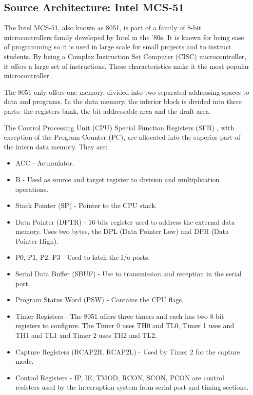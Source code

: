 \documentclass{report}
\begin{document}
		\subsection{Source Architecture: Intel MCS-51}
		
		\par The Intel MCS-51, also known as 8051, is part of a family of 8-bit microcontrollers family developed by Intel in the '80s. It is known for being ease of programming so it is used in large scale for small projects and to instruct students. By being a Complex Instruction Set Computer (CISC) microcontroller, it offers a large set of instructions. These characteristics make it the most popular microcontroller.
		\par The 8051 only offers one memory, divided into two separated addressing spaces to data and programs. In the data memory, the inferior block is divided into three parts: the registers bank, the bit addressable area and the draft area.
		\par The Control Processing Unit (CPU) Special Function Registers (SFR) , with exception of the Program Counter (PC), are allocated into the superior part of the intern data memory.  They are:
		\begin{itemize}
			\item ACC - Acumulator.
			\item B - Used as source and target register to division and multiplication operations.
			\item Stack Pointer (SP) - Pointer to the CPU stack.
			\item Data Pointer (DPTR) - 16-bits register used to address the external data memory. Uses two bytes, the DPL (Data Pointer Low) and DPH (Data Pointer High).
			\item P0, P1, P2, P3 - Used to latch the I/o ports.
			\item Serial Data Buffer (SBUF) - Use to transmission and reception in the serial port.
			\item Program Status Word (PSW) - Contains the CPU flags.
			\item Timer Registers - The 8051 offers three timers and each has two 8-bit registers to configure. The Timer 0 uses TH0 and TL0, Timer 1 uses and TH1 and TL1 and Timer 2 uses TH2 and TL2.
			\item Capture Registers (RCAP2H, RCAP2L) - Used by Timer 2 for the capture mode.
			\item Control Registers - IP, IE, TMOD, RCON, SCON, PCON are control resisters used by the interruption system from serial port and timing sections. 
		\end{itemize}
		
\end{document}
